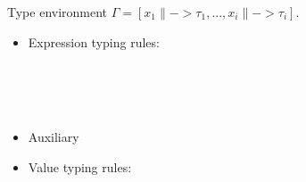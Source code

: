 Type environment $\Gamma = [x_1 \|-> \tau_1, ..., x_i \|-> {\tau_i} ]$.
\begin{itemize}

\item Expression typing rules:\\


\\[1ex]


\\[1ex]

\\[2ex]


\item Auxiliary 

\PT{\Axiom{\Typef{\iotan}{\int} {\tseq{\int}}}}
\PT{\Axiom{\Typef{\plusn}{\int,\int} {\int}}}

\item Value typing rules: \\



\end{itemize}

